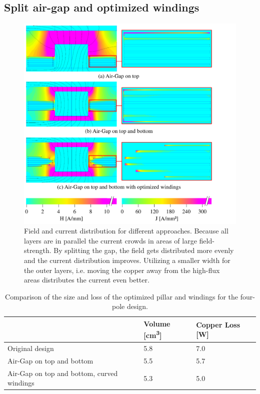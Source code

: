 \documentclass{IPEC2026}
\begin{document}
\subsection{Split air-gap and optimized windings}
\begin{figure}
  \includegraphics[page=1, trim = 0cm 0cm 3cm 0cm, clip, width=\columnwidth]{figures/IPEC_Figure_AirGap.pdf}
  \caption{Field and current distribution for different approaches. Because all layers are in parallel the current crowds in areas of large field-strength. By splitting the gap, the field gets distributed more evenly and the current distribution improves. Utilizing a smaller width for the outer layers, i.e. moving the copper away from the high-flux areas distributes the current even better.}
  \label{fig:OptimizedGap}
\end{figure}

\begin{table}
  \centering
  \caption{Comparison of the size and loss of the optimized pillar and windings for the four-pole design.}
    \begin{tabular}{|p{}|p{}|p{}|}
    \hline  
      & {Volume [\unit{\cubic\cm}]} & {Copper Loss [\unit{\W}]} \\
    \hline
    \hline
    Original design & 5.8 & 7.0 \\
    \hline
    Air-Gap on top and bottom & 5.5 & 5.7 \\
    \hline
    Air-Gap on top and bottom, curved windings & 5.3 & 5.0 \\
    \hline
    \end{tabular}%
  \label{tab:OptimizationPQ}%
\end{table}%
\end{document}

